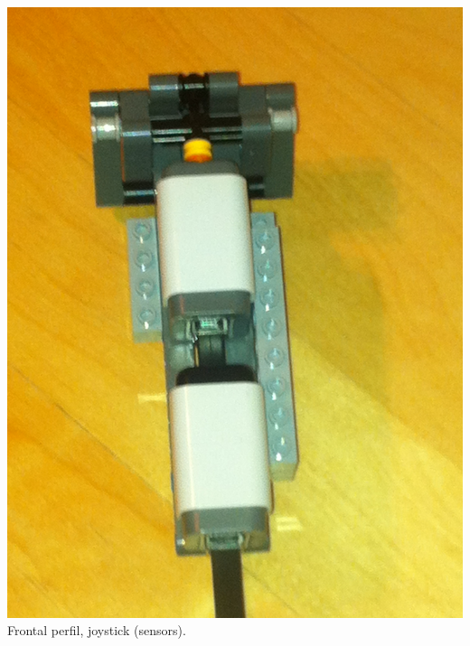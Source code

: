 \documentclass[a4paper,11pt]{article}
\begin{document}
\begin{multicols}{2}
			\begin{center}
				\includegraphics[scale=0.1]{img/joystick_front.png}\\
				Frontal perfil, joystick (sensors).
			\end{center}


\end{multicols}
\end{document}
